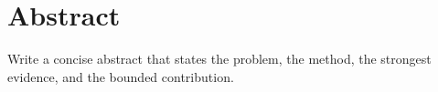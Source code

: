 \chapter*{Abstract}
Write a concise abstract that states the problem, the method, the strongest
evidence, and the bounded contribution.
\clearpage
